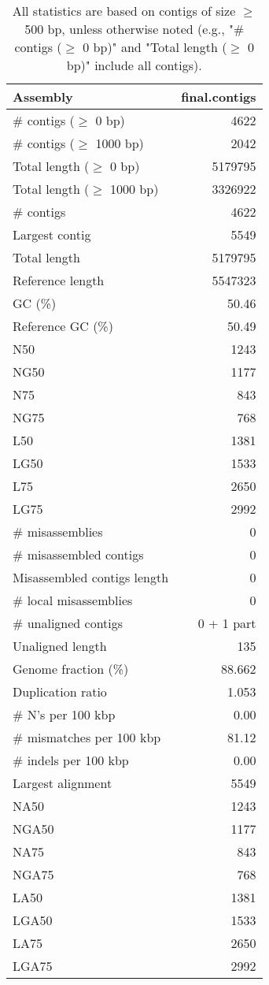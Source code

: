 \documentclass[12pt,a4paper]{article}
\begin{document}
\begin{table}[ht]
\begin{center}
\caption{All statistics are based on contigs of size $\geq$ 500 bp, unless otherwise noted (e.g., "\# contigs ($\geq$ 0 bp)" and "Total length ($\geq$ 0 bp)" include all contigs).}
\begin{tabular}{|l*{1}{|r}|}
\hline
Assembly & final.contigs \\ \hline
\# contigs ($\geq$ 0 bp) & 4622 \\ \hline
\# contigs ($\geq$ 1000 bp) & 2042 \\ \hline
Total length ($\geq$ 0 bp) & 5179795 \\ \hline
Total length ($\geq$ 1000 bp) & 3326922 \\ \hline
\# contigs & 4622 \\ \hline
Largest contig & 5549 \\ \hline
Total length & 5179795 \\ \hline
Reference length & 5547323 \\ \hline
GC (\%) & 50.46 \\ \hline
Reference GC (\%) & 50.49 \\ \hline
N50 & 1243 \\ \hline
NG50 & 1177 \\ \hline
N75 & 843 \\ \hline
NG75 & 768 \\ \hline
L50 & 1381 \\ \hline
LG50 & 1533 \\ \hline
L75 & 2650 \\ \hline
LG75 & 2992 \\ \hline
\# misassemblies & 0 \\ \hline
\# misassembled contigs & 0 \\ \hline
Misassembled contigs length & 0 \\ \hline
\# local misassemblies & 0 \\ \hline
\# unaligned contigs & 0 + 1 part \\ \hline
Unaligned length & 135 \\ \hline
Genome fraction (\%) & 88.662 \\ \hline
Duplication ratio & 1.053 \\ \hline
\# N's per 100 kbp & 0.00 \\ \hline
\# mismatches per 100 kbp & 81.12 \\ \hline
\# indels per 100 kbp & 0.00 \\ \hline
Largest alignment & 5549 \\ \hline
NA50 & 1243 \\ \hline
NGA50 & 1177 \\ \hline
NA75 & 843 \\ \hline
NGA75 & 768 \\ \hline
LA50 & 1381 \\ \hline
LGA50 & 1533 \\ \hline
LA75 & 2650 \\ \hline
LGA75 & 2992 \\ \hline
\end{tabular}
\end{center}
\end{table}
\end{document}

